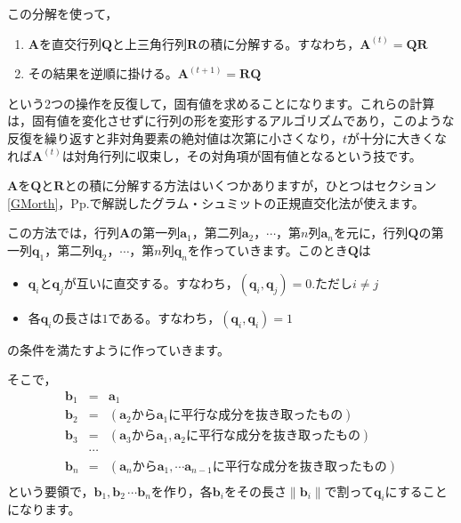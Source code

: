 \documentclass{ltjsbook}
\begin{document}
この分解を使って，
\begin{enumerate}
	\item $\bm{A}$を直交行列$\bm{Q}$と上三角行列$\bm{R}$の積に分解する。すなわち，$\bm{A}^{(t)} = \bm{Q} \bm{R}$
	\item その結果を逆順に掛ける。$\bm{A}^{(t+1)}=\bm{R} \bm{Q}$
\end{enumerate}
という2つの操作を反復して，固有値を求めることになります。これらの計算は，固有値を変化させずに行列の形を変形するアルゴリズムであり，このような反復を繰り返すと非対角要素の絶対値は次第に小さくなり，$t$が十分に大きくなれば$\bm{A}^{(t)}$は対角行列に収束し，その対角項が固有値となるという技です。

$\bm{A}$を$\bm{Q}$と$\bm{R}$との積に分解する方法はいくつかありますが，ひとつはセクション\ref{GMorth}，Pp.\pageref{GMorth}で解説したグラム・シュミットの正規直交化法が使えます。

この方法では，行列$\bm{A}$の第一列$\bm{a}_1$，第二列$\bm{a}_2$，$\cdots$，第$n$列$\bm{a}_n$を元に，行列$\bm{Q}$の第一列$\bm{q}_1$，第二列$\bm{q}_2$，$\cdots$，第$n$列$\bm{q}_n$を作っていきます。このとき$\bm{Q}$は
\begin{itemize}
	\item $\bm{q}_i$と$\bm{q}_j$が互いに直交する。すなわち，$(\bm{q}_i,\bm{q}_j)=0.$ただし$i \neq j$
	\item 各$\bm{q}_i$の長さは$1$である。すなわち，$(\bm{q}_i,\bm{q}_i)=1$
\end{itemize}
の条件を満たすように作っていきます。

そこで，
\begin{equation}
	\begin{array}{ccl}
		\bm{b}_1 & =      & \bm{a}_1                                                \\
		\bm{b}_2 & =      & (\bm{a}_2 から\bm{a}_1 に平行な成分を抜き取ったもの)                    \\
		\bm{b}_3 & =      & (\bm{a}_3 から\bm{a}_1,\bm{a}_2に平行な成分を抜き取ったもの)            \\
		         & \cdots &                                                         \\
		\bm{b}_n & =      & (\bm{a}_n から\bm{a}_1,\cdots \bm{a}_{n-1}に平行な成分を抜き取ったもの) \\
	\end{array}
\end{equation}
という要領で，$\bm{b}_1,\bm{b}_2 \,\cdots \bm{b}_n$を作り，各$\bm{b}_i$をその長さ$\| \bm{b}_i \|$で割って$\bm{q}_i$にすることになります。
\end{document}
